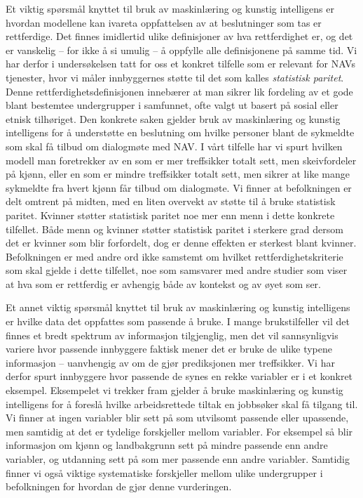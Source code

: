 \documentclass[
]{book}
\begin{document}
Et viktig spørsmål knyttet til bruk av maskinlæring og kunstig intelligens er hvordan modellene kan ivareta oppfattelsen av at beslutninger som tas er rettferdige.
Det finnes imidlertid ulike definisjoner av hva rettferdighet er, og det er vanskelig -- for ikke å si umulig -- å oppfylle alle definisjonene på samme tid.
Vi har derfor i undersøkelsen tatt for oss et konkret tilfelle som er relevant for NAVs tjenester, hvor vi måler innbyggernes støtte til det som kalles \emph{statistisk paritet}.
Denne rettferdighetsdefinisjonen innebærer at man sikrer lik fordeling av et gode blant bestemtee undergrupper i samfunnet, ofte valgt ut basert på sosial eller etnisk tilhøriget.
Den konkrete saken gjelder bruk av maskinlæring og kunstig intelligens for å understøtte en beslutning om hvilke personer blant de sykmeldte som skal få tilbud om dialogmøte med NAV.
I vårt tilfelle har vi spurt hvilken modell man foretrekker av en som er mer treffsikker totalt sett, men skeivfordeler på kjønn, eller en som er mindre treffsikker totalt sett, men sikrer at like mange sykmeldte fra hvert kjønn får tilbud om dialogmøte.
Vi finner at befolkningen er delt omtrent på midten, med en liten overvekt av støtte til å bruke statistisk paritet.
Kvinner støtter statistisk paritet noe mer enn menn i dette konkrete tilfellet.
Både menn og kvinner støtter statistisk paritet i sterkere grad dersom det er kvinner som blir forfordelt, dog er denne effekten er sterkest blant kvinner.
Befolkningen er med andre ord ikke samstemt om hvilket rettferdighetskriterie som skal gjelde i dette tilfellet, noe som samsvarer med andre studier som viser at hva som er rettferdig er avhengig både av kontekst og av øyet som ser.

Et annet viktig spørsmål knyttet til bruk av maskinlæring og kunstig intelligens er hvilke data det oppfattes som passende å bruke.
I mange brukstilfeller vil det finnes et bredt spektrum av informasjon tilgjenglig, men det vil sannsynligvis variere hvor passende innbyggere faktisk mener det er bruke de ulike typene informasjon -- uanvhengig av om de gjør prediksjonen mer treffsikker.
Vi har derfor spurt innbyggere hvor passende de synes en rekke variabler er i et konkret eksempel.
Eksempelet vi trekker fram gjelder å bruke maskinlæring og kunstig intelligens for å foreslå hvilke arbeidsrettede tiltak en jobbsøker skal få tilgang til.
Vi finner at ingen variabler blir sett på som utvilsomt passende eller upassende, men samtidig at det er tydelige forskjeller mellom variabler.
For eksempel så blir informasjon om kjønn og landbakgrunn sett på mindre passende enn andre variabler, og utdanning sett på som mer passende enn andre variabler.
Samtidig finner vi også viktige systematiske forskjeller mellom ulike undergrupper i befolkningen for hvordan de gjør denne vurderingen.
\end{document}
